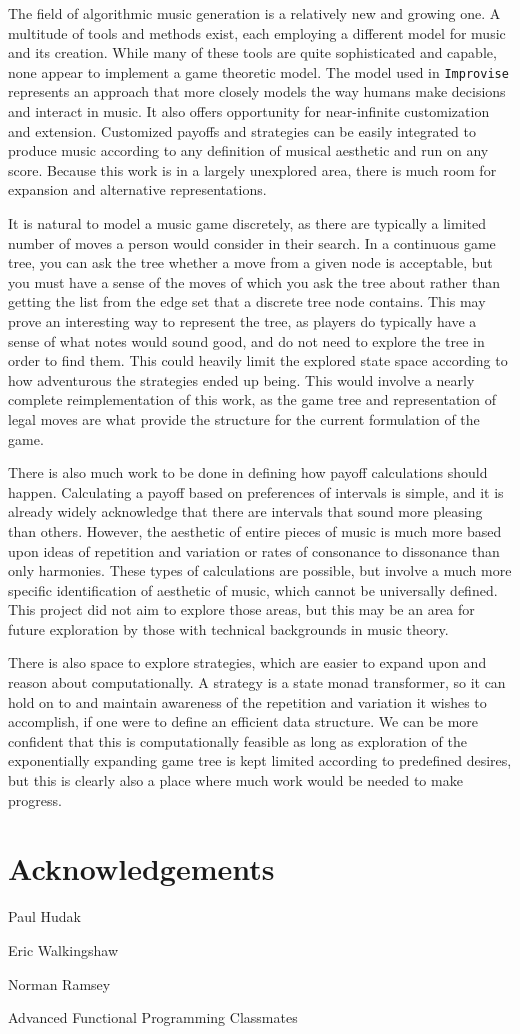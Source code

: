 \documentclass{article}
\begin{document}
The field of algorithmic music generation is a relatively new and
growing one. A multitude of tools and methods exist, each employing a
different model for music and its creation. While many of these tools
are quite sophisticated and capable, none appear to implement a game
theoretic model. The model used in \texttt{Improvise} represents an approach
that more closely models the way humans make decisions and interact in
music. It also offers opportunity for near-infinite customization and
extension. Customized payoffs and strategies can be easily integrated to
produce music according to any definition of musical aesthetic and run
on any score. Because this work is in a largely unexplored area, there
is much room for expansion and alternative representations.

It is natural to model a music game discretely, as there are
typically a limited number of moves a person would consider in their
search. In a continuous game tree, you can ask the tree
whether a move from a given node is acceptable, but you must have a
sense of the moves of which you ask the tree about rather than getting
the list from the edge set that a discrete tree node contains. This may
prove an interesting way to represent the tree, as players do typically
have a sense of what notes would sound good, and do not need to explore
the tree in order to find them. This could heavily limit the explored
state space according to how adventurous the strategies ended up being.
This would involve a nearly complete reimplementation of this work,
as the game tree and representation of legal moves are what provide the
structure for the current formulation of the game.

There is also much work to be done in defining how payoff calculations
should happen. Calculating a payoff based on preferences of intervals is
simple, and it is already widely acknowledge that there are intervals
that sound more pleasing than others. However, the aesthetic of entire
pieces of music is much more based upon ideas of repetition and
variation or rates of consonance to dissonance than only harmonies.
These types of calculations are possible, but involve a much more
specific identification of aesthetic of music, which cannot be universally
defined. This project did not aim to explore those areas, but this
may be an area for future exploration by those with technical
backgrounds in music theory.

There is also space to explore strategies, which are easier to expand upon and reason
about computationally. A strategy is a state monad
transformer, so it can hold on to and maintain awareness of the
repetition and variation it wishes to accomplish, if one were to define
an efficient data structure. We can be more confident that this is
computationally feasible as long as exploration of the exponentially
expanding game tree is kept limited according to predefined desires, but
this is clearly also a place where much work would be needed to make
progress.

\section{Acknowledgements}

Paul Hudak

Eric Walkingshaw

Norman Ramsey

Advanced Functional Programming Classmates
\end{document}
